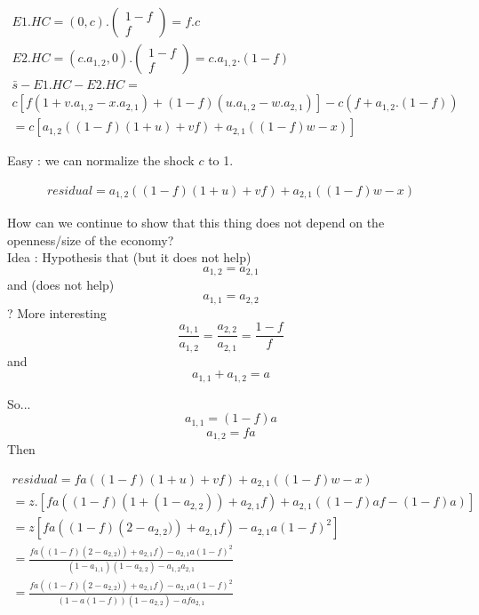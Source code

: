 \documentclass[11pt,a4paper]{article}
\begin{document}
\begin{gather*}
E1.HC = \left(0,c\right).\left(\begin{matrix}1-f\\f\end{matrix}\right)=f.c
\\
E2.HC=\left(c.a_{1,2},0\right).\left(\begin{matrix}1-f\\f\end{matrix}\right)=c.a_{1,2}.\left(1-f\right)
\\ 
\bar{s}-E1.HC-E2.HC=
\\
c\left[f\left(1+v.a_{1,2}-x.a_{2,1}\right)+\left(1-f\right)\left(u.a_{1,2}-w.a_{2,1}\right)\right]-c\left(f+a_{1,2}.\left(1-f\right)\right)
\\
=c\left[a_{1,2}\left(\left(1-f\right)\left(1+u\right)+vf\right)+a_{2,1}\left(\left(1-f\right)w-x\right)\right]
\end{gather*}

Easy : we can normalize the shock $c$ to 1. 

\begin{gather*}
residual=a_{1,2}\left(\left(1-f\right)\left(1+u\right)+vf\right)+a_{2,1}\left(\left(1-f\right)w-x\right)
\end{gather*}

How can we continue to show that this thing does not depend on the openness/size of the economy?
\\
 Idea : Hypothesis that (but it does not help) $$a_{1,2}=a_{2,1}$$ and (does not help)$$a_{1,1}=a_{2,2}$$ ? 
More interesting $$\frac{a_{1,1}}{a_{1,2}}=\frac{a_{2,2}}{a_{2,1}}=\frac{1-f}{f}$$ 
and 
$$a_{1,1}+a_{1,2}=a$$

So...
$$a_{1,1}=(1-f)a$$
$$a_{1,2}=fa$$
Then 

\begin{gather*}
residual=fa\left(\left(1-f\right)\left(1+u\right)+vf\right)+a_{2,1}\left(\left(1-f\right)w-x\right) \\
=z.\left[fa\left(\left(1-f\right)\left(1+(1-a_{2,2})\right)+a_{2,1}f\right)+a_{2,1}\left(\left(1-f\right)af-(1-f)a\right)\right] \\
= z\left[fa\left(\left(1-f\right)\left(2-a_{2,2})\right)+a_{2,1}f\right)-a_{2,1}a\left(1-f\right)^2\right] \\
= \frac{fa\left(\left(1-f\right)\left(2-a_{2,2})\right)+a_{2,1}f\right)-a_{2,1}a\left(1-f\right)^2}{\left(1-a_{1,1}\right)\left(1-a_{2,2}\right)-a_{1,2}a_{2,1}} \\
= \frac{fa\left(\left(1-f\right)\left(2-a_{2,2})\right)+a_{2,1}f\right)-a_{2,1}a\left(1-f\right)^2}{\left(1-a(1-f)\right)\left(1-a_{2,2}\right)-afa_{2,1}}
\end{gather*}
\end{document}
